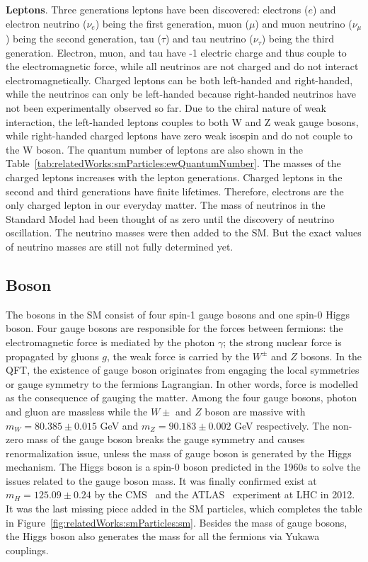 \textbf{Leptons}. Three generations leptons have been discovered: electrons ($e$) and electron neutrino ($\nu_e$) being the first generation, muon ($\mu$) and muon neutrino ($\nu_\mu$) being the second generation, tau ($\tau$) and tau neutrino ($\nu_\tau$) being the third generation. Electron, muon, and tau have -1 electric charge and thus couple to the electromagnetic force, while all neutrinos are not charged and do not interact electromagnetically. Charged leptons can be both left-handed and right-handed, while the neutrinos can only be left-handed because right-handed neutrinos have not been experimentally observed so far. Due to the chiral nature of weak interaction, the left-handed leptons couples to both W and Z weak gauge bosons, while right-handed charged leptons have zero weak isospin and do not couple to the W boson. The quantum number of leptons are also shown in the Table~\ref{tab:relatedWorks:smParticles:ewQuantumNumber}. The masses of the charged leptons increases with the lepton generations. Charged leptons in the second and third generations have finite lifetimes. Therefore, electrons are the only charged lepton in our everyday matter. The mass of neutrinos in the Standard Model had been thought of as zero until the discovery of neutrino oscillation. The neutrino masses were then added to the SM. But the exact values of neutrino masses are still not fully determined yet. 




\subsection{Boson}
\label{sec:relatedWorks:smParticles:boson}

The bosons in the SM consist of four spin-1 gauge bosons and one spin-0 Higgs boson. Four gauge bosons are responsible for the forces between fermions: the electromagnetic force is mediated by the photon $\gamma$; the strong nuclear force is propagated by gluons $g$, the weak force is carried by the $W^\pm$ and $Z$ bosons. In the QFT, the existence of gauge boson originates from engaging the local symmetries or gauge symmetry to the fermions Lagrangian. In other words, force is modelled as the consequence of gauging the matter. Among the four gauge bosons, photon and gluon are massless while the $W\pm$ and $Z$ boson are massive with $m_W = 80.385\pm0.015$ GeV and $m_Z = 90.183\pm 0.002$ GeV \cite{pdg2020} respectively. The non-zero mass of the gauge boson breaks the gauge symmetry and causes renormalization issue, unless the mass of gauge boson is generated by the Higgs mechanism. The Higgs boson is a spin-0 boson predicted in the 1960s to solve the issues related to the gauge boson mass. It was finally confirmed exist at $m_H=125.09\pm 0.24$ \GeV by the CMS~\cite{Chatrchyan:2012ufa} and the ATLAS~\cite{Aad:2012tfa} experiment at LHC in 2012. It was the last missing piece added in the SM particles, which completes the table in Figure~\ref{fig:relatedWorks:smParticles:sm}. Besides the mass of gauge bosons, the Higgs boson also generates the mass for all the fermions via Yukawa couplings.

